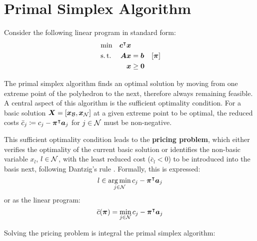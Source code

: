 \section{Primal Simplex Algorithm}\label{sec:preliminaries_psa}
Consider the following linear program in standard form:
\begin{equation}\label{eq:lp_standard}
\begin{aligned}
&\min & {\bm{c}}^\intercal {\bm{x}} & & \\
&\operatorname{s.t.} & {\bm{A}} {\bm{x}} & = {\bm{b}} & \left[{\bm{\pi}}\right] \\
&& {\bm{x}} & \geq {\bm{0}} &
\end{aligned}
\end{equation}

The primal simplex algorithm \cite{dantzig1997simplex} finds an optimal solution by moving from one extreme point of the polyhedron to the next, therefore always remaining feasible. A central aspect of this algorithm is the sufficient optimality condition. For a basic solution ${\bm{X}} = \left[{\bm{x}}_{\mathcal{B}}, {\bm{x}}_{\mathcal{N}}\right]$ at a given extreme point to be optimal, the reduced costs $\bar{c}_j \coloneqq c_j - \vec{\pi}\transpose \vec{a}_j$ for $j \in \mathcal{N}$ must be non-negative.

This sufficient optimality condition leads to the \textbf{pricing problem}, which either verifies the optimality of the current basic solution or identifies the non-basic variable $x_l$, $l \in \mathcal{N}$, with the least reduced cost ($\bar{c}_l < 0$) to be introduced into the basis next, following Dantzig's rule \cite{dantzig1997simplex,ploskas2014pivoting}. Formally, this is expressed:
\begin{equation*}
l \in \underset{j \in \mathcal{N}}{\arg\min} \, c_j - {\bm{\pi}}^\intercal {\bm{a}}_j
\end{equation*}
or as the linear program:
\begin{equation}\label{eq:psa_pp}
\bar{c}(\vec{\pi}) = \underset{j \in \indexset{N}}{\min} \, c_j - \vec{\pi}\transpose \vec{a}_j
\end{equation}

Solving the pricing problem is integral the primal simplex algorithm:

